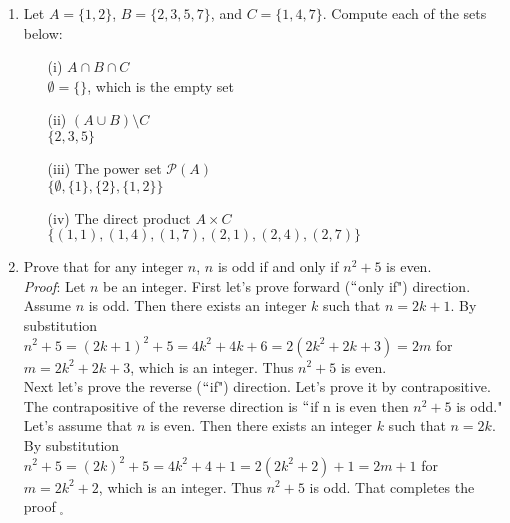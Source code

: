 \documentclass[12pt]{amsart}
\theoremstyle{definition}
\theoremstyle{remark}
\newcommand{\powerset}{\mathscr P}
\begin{document}
\begin{enumerate}
\newpage


\item Let $A=\{1,2\}$, $B=\{2,3,5,7\}$, and $C=\{1,4,7\}$.  Compute each of the sets below:\\


\begin{enumerate}

\item[(i)] $A\cap B\cap C$\\


{\color{red}$\emptyset=\{\}$, which is the empty set}


\vfill

\item[(ii)] $(A\cup B)\setminus C$\\

{\color{red}  $\{2,3,5\}$}

\vfill

\item[(iii)] The power set $\powerset{(A)}$\\

{\color{red} $\{\emptyset, \{1\},\{2\},\{1,2\}\}$}

\vfill

\item[(iv)] The direct product $A\times C$\\

{\color{red} $\{(1,1),(1,4),(1,7),(2,1),(2,4),(2,7)\}$ }

\vfill

\end{enumerate}

\newpage

\item Prove that for any integer $n$, $n$ is odd if and only if $n^2+5$ is even.\\

{\color{red}  \emph{Proof}:  Let $n$ be an integer.  First let's prove forward ($``$only if") direction.  Assume $n$ is odd.  Then there exists an integer $k$ such that $n=2k+1$.  By substitution \\ $n^2+5=(2k+1)^2+5=4k^2+4k+6=2(2k^2+2k+3)=2m$ for $m=2k^2+2k+3$, which is an integer.  Thus $n^2+5$ is even. \\

Next let's prove the reverse ($``$if") direction.  Let's prove it by contrapositive.  The contrapositive of the reverse direction is $``$if n is even then $n^2+5$ is odd."  Let's assume that $n$ is even.  Then there exists an integer $k$ such that $n=2k$.  By substitution\\ $n^2+5=(2k)^2+5=4k^2+4+1=2(2k^2+2)+1=2m+1$ for $m=2k^2+2$, which is an integer.  Thus $n^2+5$ is odd.  That completes the proof$\;_{\square}$}


\end{enumerate}
\end{document}
